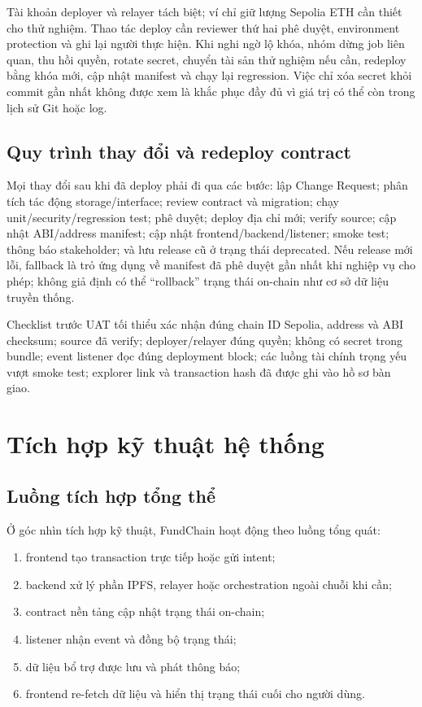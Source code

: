 Tài khoản deployer và relayer tách biệt; ví chỉ giữ lượng Sepolia ETH cần thiết cho thử nghiệm. Thao tác deploy cần reviewer thứ hai phê duyệt, environment protection và ghi lại người thực hiện. Khi nghi ngờ lộ khóa, nhóm dừng job liên quan, thu hồi quyền, rotate secret, chuyển tài sản thử nghiệm nếu cần, redeploy bằng khóa mới, cập nhật manifest và chạy lại regression. Việc chỉ xóa secret khỏi commit gần nhất không được xem là khắc phục đầy đủ vì giá trị có thể còn trong lịch sử Git hoặc log.

\subsection{Quy trình thay đổi và redeploy contract}

Mọi thay đổi sau khi đã deploy phải đi qua các bước: lập Change Request; phân tích tác động storage/interface; review contract và migration; chạy unit/security/regression test; phê duyệt; deploy địa chỉ mới; verify source; cập nhật ABI/address manifest; cập nhật frontend/backend/listener; smoke test; thông báo stakeholder; và lưu release cũ ở trạng thái deprecated. Nếu release mới lỗi, fallback là trỏ ứng dụng về manifest đã phê duyệt gần nhất khi nghiệp vụ cho phép; không giả định có thể ``rollback'' trạng thái on-chain như cơ sở dữ liệu truyền thống.

Checklist trước UAT tối thiểu xác nhận đúng chain ID Sepolia, address và ABI checksum; source đã verify; deployer/relayer đúng quyền; không có secret trong bundle; event listener đọc đúng deployment block; các luồng tài chính trọng yếu vượt smoke test; explorer link và transaction hash đã được ghi vào hồ sơ bàn giao.

\iffalse
\section{Tích hợp kỹ thuật hệ thống}

\subsection{Luồng tích hợp tổng thể}

Ở góc nhìn tích hợp kỹ thuật, FundChain hoạt động theo luồng tổng quát:

\begin{enumerate}
  \item frontend tạo transaction trực tiếp hoặc gửi intent;
  \item backend xử lý phần IPFS, relayer hoặc orchestration ngoài chuỗi khi cần;
  \item contract nền tảng cập nhật trạng thái on-chain;
  \item listener nhận event và đồng bộ trạng thái;
  \item dữ liệu bổ trợ được lưu và phát thông báo;
  \item frontend re-fetch dữ liệu và hiển thị trạng thái cuối cho người dùng.
\end{enumerate}

